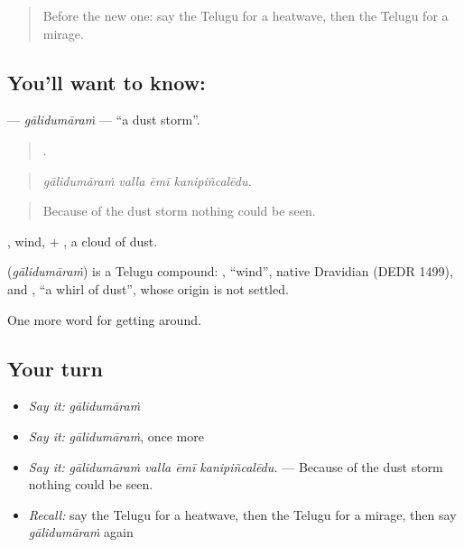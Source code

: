 \label{lesson:TE-C481-galidumaram}



\begin{quote}
Before the new one: say the Telugu for a heatwave, then the Telugu for a mirage.
\end{quote}

\subsection*{You'll want to know: }
\textbf{} — \emph{gālidumāraṁ} — \textquotedblleft{}a dust storm\textquotedblright{}.

\begin{quote}
   .
\end{quote}

\begin{quote}
\emph{gālidumāraṁ valla ēmī kanipiñcalēdu.}
\end{quote}

\begin{quote}
Because of the dust storm nothing could be seen.
\end{quote}

, wind, + , a cloud of dust.

\begin{cousinweb}
\textbf{} (\emph{gālidumāraṁ}) is a Telugu compound: , \textquotedblleft{}wind\textquotedblright{}, native Dravidian (DEDR 1499), and , \textquotedblleft{}a whirl of dust\textquotedblright{}, whose origin is not settled.
\end{cousinweb}

\begin{grammarlens}[title={What you've built}]
One more word for getting around.
\end{grammarlens}

\subsection*{Your turn}
\begin{itemize}
\raggedright
  \item \emph{Say it:} \emph{gālidumāraṁ}
  \item \emph{Say it:} \emph{gālidumāraṁ}, once more
  \item \emph{Say it:} \emph{gālidumāraṁ valla ēmī kanipiñcalēdu.} — Because of the dust storm nothing could be seen.
  \item \emph{Recall:} say the Telugu for a heatwave, then the Telugu for a mirage, then say \emph{gālidumāraṁ} again
\end{itemize}

